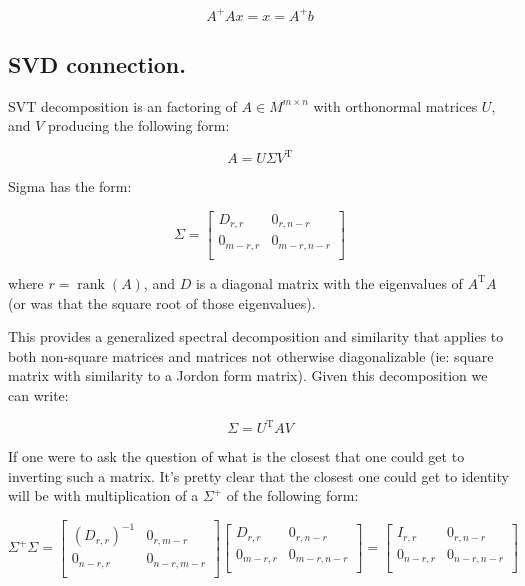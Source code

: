 \documentclass{article}      %
\DeclareMathOperator{\TextTranspose}{T}
\DeclareMathOperator{\rank}{rank}
\newcommand{\transpose}[1]{{{#1}^{\TextTranspose}}}
\begin{document}
\begin{equation}
A^{+} A x = x = A^{+} b
\end{equation}

\subsection{ SVD connection. }

SVT decomposition is an factoring of $A \in M^{m \times n}$ with orthonormal matrices $U$, and $V$ producing the following form:

\[
A = U \Sigma \transpose{V}
\]

Sigma has the form:

\[
\Sigma = 
\begin{bmatrix}
D_{r,r} & 0_{r,n-r} \\
0_{m-r,r} & 0_{m-r,n-r} \\
\end{bmatrix}
\]

where $r = \rank(A)$, and $D$ is a diagonal matrix with the eigenvalues of $\transpose{A}A$ (or was that the square root of those eigenvalues).

This provides a generalized spectral decomposition and similarity that applies to both non-square matrices and matrices not otherwise diagonalizable
(ie: square matrix with similarity to a Jordon form matrix).  Given this decomposition we can write:

\[
\Sigma = \transpose{U} A V
\]

If one were to ask the question of what is the closest that one could get to inverting such a matrix.  It's pretty clear that the closest one could get to
identity will be with multiplication of a $\Sigma^{+}$ of the following form:

\[
\Sigma^{+} \Sigma
=
\begin{bmatrix}
(D_{r,r})^{-1} & 0_{r,m-r} \\
0_{n-r,r} & 0_{n-r,m-r} \\
\end{bmatrix}
\begin{bmatrix}
D_{r,r} & 0_{r,n-r} \\
0_{m-r,r} & 0_{m-r,n-r} \\
\end{bmatrix}
=
\begin{bmatrix}
I_{r,r} & 0_{r,n-r} \\
0_{n-r,r} & 0_{n-r,n-r} \\
\end{bmatrix}
\]
\end{document}
